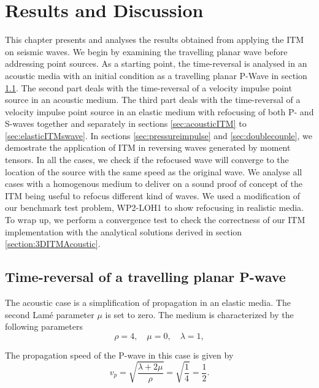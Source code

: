 \chapter{Results and Discussion}\label{chapter:Results}
This chapter presents and analyses the results obtained from applying the \ac{ITM} on seismic waves.
We begin by examining the travelling planar wave before addressing point sources. 
As a starting point, the time-reversal is analysed in an acoustic media with an initial condition
as a travelling planar P-Wave in section \ref{sec:acoustictravelling}. The second part deals with the time-reversal of a velocity impulse point source in an acoustic medium. The third part deals with the time-reversal
of a velocity impulse point source in an elastic medium with refocusing of both P- and S-waves together and separately in sections \ref{sec:acousticITM} to \ref{sec:elasticITMswave}. 
In sections \ref{sec:pressureimpulse} and \ref{sec:doublecouple}, we demostrate the application of \ac{ITM} in reversing waves generated by moment tensors. In all the cases, we check if the refocused wave will converge to the location of the source with the same speed as the original wave. We analyse all cases with a homogenous medium to deliver on a sound proof of concept of the \ac{ITM} being useful to refocus different kind of waves. We used a modification
of our benchmark test problem, WP2-LOH1 to show refocusing in realistic media.\\
To wrap up, we perform a convergence test to check the correctness of our \ac{ITM} implementation with the analytical solutions derived in section \ref{section:3DITMAcoustic}.

\section{Time-reversal of a travelling planar P-wave} \label{sec:acoustictravelling}
The acoustic case is a simplification of propagation in an elastic media. The second Lam\'{e} parameter $\mu$ is set to zero. The medium is characterized by the following parameters
\begin{equation}
    \rho = 4, \quad \mu = 0, \quad \lambda = 1 ,
\end{equation}

The propagation speed of the P-wave in this case is given by
\begin{equation}
    v_p = \sqrt{\frac{\lambda + 2 \mu}{\rho}} = \sqrt{\frac{1}{4}} = \frac{1}{2} .
\end{equation}

